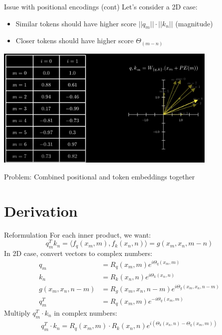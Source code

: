 \documentclass{beamer}
\begin{document}
\begin{frame}[t]{Issue with positional encodings (cont)}
    Let's consider a 2D case:
    \begin{itemize}[label=-]
        \item Similar tokens should have higher score $||q_m|| \cdot ||k_n||$ (magnitude) 
        \item Closer tokens should have higher score $\Theta_{(m-n)}$
    \end{itemize}
    \begin{center}
        \includegraphics[width=0.8\textwidth]{./img/rope_2.png}
    \end{center}
    Problem: Combined positional and token embeddings together
\end{frame}
\section{Derivation}
\begin{frame}[t]{Reformulation}
    For each inner product, we want: \[q_m^T k_n = \langle f_q(x_m, m), f_k(x_n, n) \rangle = g(x_m, x_n, m - n)\]
    In 2D case, convert vectors to complex numbers:
    \begin{align}
        q_m &= R_q(x_m, m)e^{i \Theta_q(x_m,m)} \\
        k_n &= R_k(x_n, n)e^{i \Theta_k(x_n,n)} \\
        g(x_m, x_n, n - m) &= R_g(x_m, x_n, n - m) e^{i \Theta_g(x_m, x_n, n - m)}\\
        q_m^T &= R_q(x_m, m)e^{-i \Theta_q(x_m,m)}
    \end{align}
    Multiply $q_m^T \cdot k_n$ in complex numbers:
    \begin{align}
        q_m^T \cdot k_n = R_q(x_m, m) \cdot R_k(x_n, n) e^{i (\Theta_k(x_n,n) - \Theta_q(x_m,m))}
    \end{align}
\end{frame}
\end{document}

